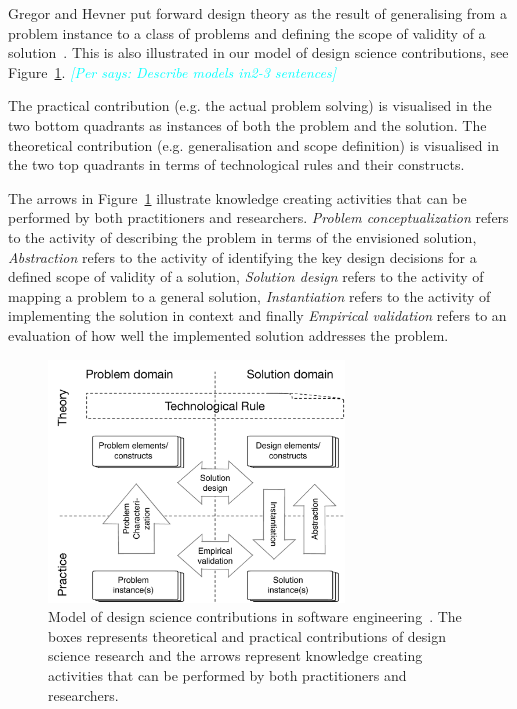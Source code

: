 \documentclass[graybox]{svmult}
\newcommand{\per}[1]{\textcolor{cyan}{{\it [Per says: #1]}}}
\newcommand{\per}[1]{}
\begin{document}
Gregor and Hevner put forward design theory as the result of generalising from a problem instance to a class of problems and defining the scope of validity of a solution~\cite{gregor_positioning_2013}. This is also illustrated in our model of design science contributions, see Figure~\ref{fig:DS_model}. \per{Describe models in2-3 sentences}

The practical contribution (e.g. the actual problem solving) is visualised in the two bottom quadrants as instances of both the problem and the solution. The theoretical contribution (e.g. generalisation and scope definition) is visualised in the two top quadrants in terms of technological rules and their constructs. 

The arrows in Figure~\ref{fig:DS_model} illustrate knowledge creating activities that can be performed by both practitioners and researchers. \emph{Problem conceptualization} refers to the activity of describing the problem in terms of the envisioned solution, \emph{Abstraction} refers to the activity of identifying the key design decisions for a defined scope of validity of a solution, \emph{Solution design} refers to the activity of mapping a problem to a general solution, \emph{Instantiation} refers to the activity of implementing the solution in context and finally \emph{Empirical validation} refers to an evaluation of how well the implemented solution addresses the problem.

\begin{figure}
  \includegraphics[width=0.7\textwidth]{Figures/DS_model.pdf}
\caption{Model of design science contributions in software engineering~\cite{Engstrom19arxiv}. The boxes represents theoretical and practical contributions of design science research and the arrows represent knowledge creating activities that can be performed by both practitioners and researchers.}
\label{fig:DS_model}       %
\end{figure}
\end{document}
